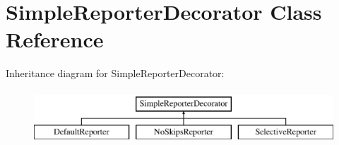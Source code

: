 \hypertarget{class_simple_reporter_decorator}{
\section{SimpleReporterDecorator Class Reference}
\label{class_simple_reporter_decorator}
}
Inheritance diagram for SimpleReporterDecorator:\begin{figure}[H]
\begin{center}
\leavevmode
\includegraphics[height=2.000000cm]{class_simple_reporter_decorator}
\end{center}
\end{figure}
